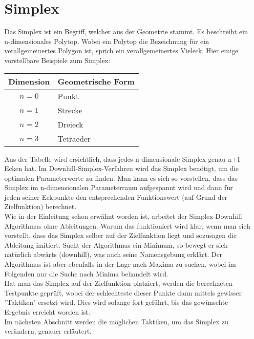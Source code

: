 \section{Simplex}
Das Simplex ist ein Begriff, welcher aus der Geometrie stammt. Es beschreibt ein n-dimensionales Polytop. Wobei ein Polytop die Bezeichnung für ein verallgemeinertes Polygon ist, sprich ein verallgemeinertes Vieleck. 
Hier einige vorstellbare Beispiele zum Simplex:\\
 
\begin{tabular}{c|l}
Dimension & Geometrische Form\\
\hline
$n=0$ & Punkt\\
$n=1$ & Strecke\\
$n=2$ & Dreieck\\
$n=3$ & Tetraeder
\end{tabular} 

Aus der Tabelle wird ersichtlich, dass jedes n-dimensionale Simplex genau n+1 Ecken hat.
Im Downhill-Simplex-Verfahren wird das Simplex benötigt, um die optimalen Parameterwerte zu finden. Man kann es sich so vorstellen, dass das Simplex im n-dimensionalen Parameterraum aufgespannt wird und dann für jeden seiner Eckpunkte den entsprechenden Funktionswert (auf Grund der Zielfunktion) berechnet. \\
Wie in der Einleitung schon erwähnt worden ist, arbeitet der Simplex-Downhill Algorithmus ohne Ableitungen. Warum das funktioniert wird klar, wenn man sich vorstellt, dass das Simplex selber auf der Zielfunktion liegt und sozusagen die Ableitung imitiert. Sucht der Algorithmus ein Minimum, so bewegt er sich natürlich abwärts (downhill), was auch seine Namensgebung erklärt. Der Algorithmus ist aber ebenfalls in der Lage nach Maxima zu suchen, wobei im Folgenden nur die Suche nach Minima behandelt wird.\\
Hat man das Simplex auf der Zielfunktion platziert, werden die berechneten Testpunkte geprüft, wobei der schlechteste dieser Punkte dann mittels gewisser "Taktiken" ersetzt wird. Dies wird solange fort geführt, bis das gewünschte Ergebnis erreicht worden ist.\\ 
Im nächsten Abschnitt werden die möglichen Taktiken, um das Simplex zu verändern, genauer erläutert. 

